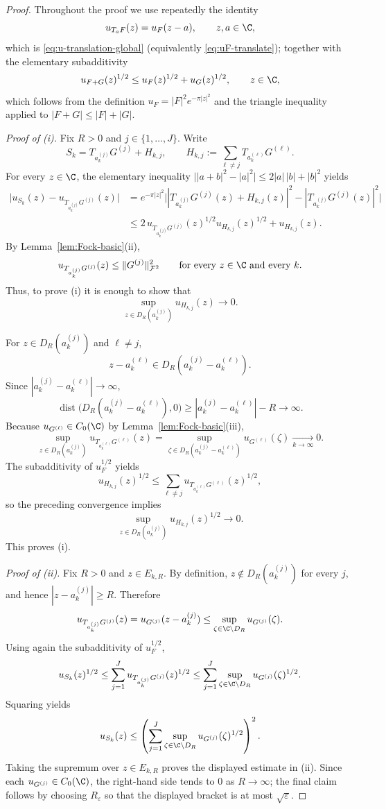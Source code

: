 \begin{proof}
Throughout the proof we use repeatedly the identity
\[
u_{T_a F}(z)=u_F(z-a),
\qquad z,a\in \C,
\]
which is \eqref{eq:u-translation-global} (equivalently
\eqref{eq:uF-translate}); together with the elementary subadditivity
\[
u_{F+G}(z)^{1/2}\le u_F(z)^{1/2}+u_G(z)^{1/2},
\qquad z\in\C,
\]
which follows from the definition \(u_F=|F|^2 e^{-\pi |z|^2}\) and the
triangle inequality applied to \(|F+G|\le |F|+|G|\).

\medskip
\noindent\emph{Proof of (i).}
Fix \(R>0\) and \(j\in\{1,\dots,J\}\). Write
\[
S_k=T_{a_k^{(j)}}G^{(j)}+H_{k,j},
\qquad
H_{k,j}:=\sum_{\ell\neq j} T_{a_k^{(\ell)}}G^{(\ell)}.
\]
For every \(z\in \C\), the elementary inequality
\(\big||a+b|^2-|a|^2\big|\le 2|a|\,|b|+|b|^2\) yields
\begin{align*}
\big|u_{S_k}(z)-u_{T_{a_k^{(j)}}G^{(j)}}(z)\big|
&=
e^{-\pi |z|^2}
\big||T_{a_k^{(j)}}G^{(j)}(z)+H_{k,j}(z)|^2
-|T_{a_k^{(j)}}G^{(j)}(z)|^2\big| \\
&\le
2\,u_{T_{a_k^{(j)}}G^{(j)}}(z)^{1/2}u_{H_{k,j}}(z)^{1/2}
+u_{H_{k,j}}(z).
\end{align*}
By Lemma~\ref{lem:Fock-basic}(ii),
\[
u_{T_{a_k^{(j)}}G^{(j)}}(z)\le \|G^{(j)}\|_{\mathcal F^2}^2
\qquad \text{for every }z\in\C\text{ and every }k.
\]
Thus, to prove (i) it is enough to show that
\[
\sup_{z\in D_R(a_k^{(j)})} u_{H_{k,j}}(z)\to 0.
\]

For \(z\in D_R(a_k^{(j)})\) and \(\ell\neq j\),
\[
z-a_k^{(\ell)}\in D_R(a_k^{(j)}-a_k^{(\ell)}).
\]
Since \(|a_k^{(j)}-a_k^{(\ell)}|\to\infty\),
\[
\operatorname{dist}\big(D_R(a_k^{(j)}-a_k^{(\ell)}),0\big)
\ge |a_k^{(j)}-a_k^{(\ell)}|-R\to\infty.
\]
Because \(u_{G^{(\ell)}}\in C_0(\C)\) by Lemma~\ref{lem:Fock-basic}(iii),
\[
\sup_{z\in D_R(a_k^{(j)})} u_{T_{a_k^{(\ell)}}G^{(\ell)}}(z)
=
\sup_{\zeta\in D_R(a_k^{(j)}-a_k^{(\ell)})} u_{G^{(\ell)}}(\zeta)
\xrightarrow[k\to\infty]{} 0.
\]
The subadditivity of \(u_F^{1/2}\) yields
\[
u_{H_{k,j}}(z)^{1/2}
\le
\sum_{\ell\neq j} u_{T_{a_k^{(\ell)}}G^{(\ell)}}(z)^{1/2},
\]
so the preceding convergence implies
\[
\sup_{z\in D_R(a_k^{(j)})} u_{H_{k,j}}(z)^{1/2}\to 0.
\]
This proves (i).

\medskip
\noindent\emph{Proof of (ii).}
Fix \(R>0\) and \(z\in E_{k,R}\). By definition, \(z\notin D_R(a_k^{(j)})\)
for every \(j\), and hence \(|z-a_k^{(j)}|\ge R\). Therefore
\[
u_{T_{a_k^{(j)}}G^{(j)}}(z)
=
u_{G^{(j)}}(z-a_k^{(j)})
\le
\sup_{\zeta\in \C\setminus D_R}u_{G^{(j)}}(\zeta).
\]
Using again the subadditivity of \(u_F^{1/2}\),
\[
u_{S_k}(z)^{1/2}
\le
\sum_{j=1}^J u_{T_{a_k^{(j)}}G^{(j)}}(z)^{1/2}
\le
\sum_{j=1}^J \sup_{\zeta\in \C\setminus D_R}u_{G^{(j)}}(\zeta)^{1/2}.
\]
Squaring yields
\[
u_{S_k}(z)
\le
\left(
\sum_{j=1}^J \sup_{\zeta\in \C\setminus D_R}u_{G^{(j)}}(\zeta)^{1/2}
\right)^2.
\]
Taking the supremum over \(z\in E_{k,R}\) proves the displayed estimate in
(ii). Since each \(u_{G^{(j)}}\in C_0(\C)\), the right-hand side tends to
\(0\) as \(R\to\infty\); the final claim follows by choosing
\(R_\varepsilon\) so that the displayed bracket is at most
\(\sqrt{\varepsilon}\).
\end{proof}

